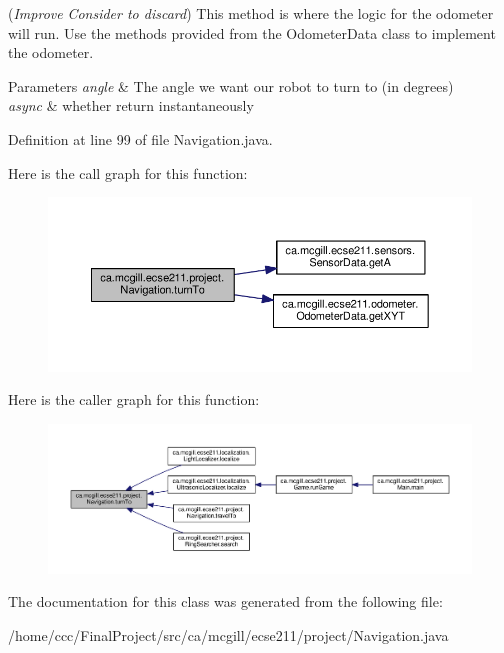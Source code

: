({\itshape Improve} {\itshape Consider to discard}) This method is where the logic for the odometer will run. Use the methods provided from the Odometer\+Data class to implement the odometer.


\begin{DoxyParams}{Parameters}
{\em angle} & The angle we want our robot to turn to (in degrees) \\
\hline
{\em async} & whether return instantaneously \\
\hline
\end{DoxyParams}


Definition at line 99 of file Navigation.\+java.

Here is the call graph for this function\+:
\nopagebreak
\begin{figure}[H]
\begin{center}
\leavevmode
\includegraphics[width=350pt]{classca_1_1mcgill_1_1ecse211_1_1project_1_1_navigation_a8b363632288a415edb9d32932555d233_cgraph}
\end{center}
\end{figure}
Here is the caller graph for this function\+:
\nopagebreak
\begin{figure}[H]
\begin{center}
\leavevmode
\includegraphics[width=350pt]{classca_1_1mcgill_1_1ecse211_1_1project_1_1_navigation_a8b363632288a415edb9d32932555d233_icgraph}
\end{center}
\end{figure}


The documentation for this class was generated from the following file\+:\begin{DoxyCompactItemize}
\item 
/home/ccc/\+Final\+Project/src/ca/mcgill/ecse211/project/Navigation.\+java\end{DoxyCompactItemize}

